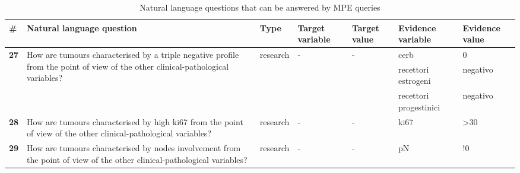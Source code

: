 \begin{sidewaystable}[h]
	\centering
	\captionsetup{name=Annex}
	\caption{Natural language questions that can be answered by MPE queries}
	\begin{tabularx}{\textwidth}{lXllllX}
		\toprule
		\textbf{\#} & Natural language question & Type  & Target variable & Target value & Evidence variable & Evidence value \\
		\midrule
		\multirow{3}[0]{*}{\textbf{27}} & \multirow{3}[0]{4cm}{How are tumours characterised by a triple negative profile from the point of view of the other clinical-pathological variables?} & \multirow{3}[0]{*}{research} & \multirow{3}[0]{*}{-} & \multirow{3}[0]{*}{-} & cerb  & 0 \\
		\addlinespace[9ex]
	      &       &       &       &       & recettori estrogeni & negativo \\
	      &       &       &       &       & recettori progestinici & negativo \\
		\textbf{28} & How are tumours characterised by high ki67 from the point of view of the other clinical-pathological variables? & research & -     & -     & ki67  & >30 \\
		\addlinespace[2ex]
		\textbf{29} & How are tumours characterised by nodes involvement from the point of view of the other clinical-pathological variables? & research & -     & -     & pN    & !0 \\
		\end{tabularx}
	\label{ann:mpe}
\end{sidewaystable}

